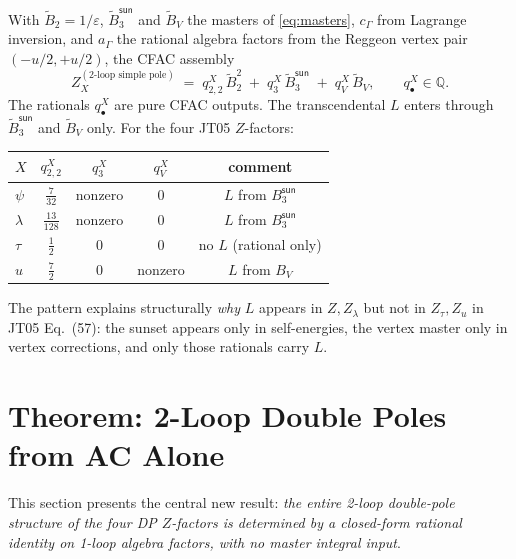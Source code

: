\documentclass[11pt,a4paper]{article}
\theoremstyle{definition}
\theoremstyle{plain}
\begin{document}
\begin{cfacbox}
With $\tilde B_2 = 1/\varepsilon$, $\tilde B_3^{\textsf{sun}}$ and
$\tilde B_V$ the masters of \eqref{eq:masters}, $c_\Gamma$ from
Lagrange inversion, and $a_\Gamma$ the rational algebra factors from
the Reggeon vertex pair $(-u/2, +u/2)$, the CFAC assembly
\begin{equation}\label{eq:assembly}
  Z_X^{(2\text{-loop simple pole})}
  \;=\; q^X_{2,2}\,\tilde B_2^2
   \;+\; q^X_{3}\,\tilde B_3^{\textsf{sun}}
   \;+\; q^X_{V}\,\tilde B_V,
   \qquad q^X_{\bullet} \in \mathbb{Q}.
\end{equation}
The rationals $q^X_{\bullet}$ are pure CFAC outputs.  The transcendental
$L$ enters through $\tilde B_3^{\textsf{sun}}$ and $\tilde B_V$ only.
For the four JT05 $Z$-factors:
\begin{center}
\begin{tabular}{@{}lcccc@{}}
\toprule
$X$ & $q^X_{2,2}$ & $q^X_3$ & $q^X_V$ & comment \\
\midrule
$\psi$ & $\tfrac{7}{32}$ & nonzero & $0$ & $L$ from $B_3^{\textsf{sun}}$ \\
$\lambda$ & $\tfrac{13}{128}$ & nonzero & $0$ & $L$ from $B_3^{\textsf{sun}}$ \\
$\tau$ & $\tfrac{1}{2}$ & $0$ & $0$ & no $L$ (rational only) \\
$u$ & $\tfrac{7}{2}$ & $0$ & nonzero & $L$ from $B_V$ \\
\bottomrule
\end{tabular}
\end{center}
The pattern explains structurally \emph{why} $L$ appears in
$Z, Z_\lambda$ but not in $Z_\tau, Z_u$ in JT05 Eq.~(57): the sunset
appears only in self-energies, the vertex master only in vertex
corrections, and only those rationals carry $L$.
\end{cfacbox}

\section{Theorem: 2-Loop Double Poles from AC Alone}
\label{sec:theorem-double-poles}

This section presents the central new result: \emph{the entire
2-loop double-pole structure of the four DP $Z$-factors is determined
by a closed-form rational identity on 1-loop algebra factors, with no
master integral input}.
\end{document}
